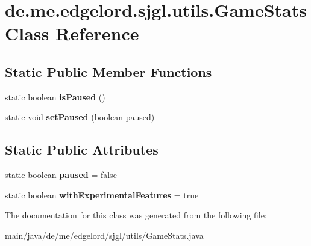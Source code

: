 \hypertarget{classde_1_1me_1_1edgelord_1_1sjgl_1_1utils_1_1_game_stats}{}\section{de.\+me.\+edgelord.\+sjgl.\+utils.\+Game\+Stats Class Reference}
\label{classde_1_1me_1_1edgelord_1_1sjgl_1_1utils_1_1_game_stats}
\subsection*{Static Public Member Functions}
\begin{DoxyCompactItemize}
\item 
\mbox{\label{classde_1_1me_1_1edgelord_1_1sjgl_1_1utils_1_1_game_stats_a15e6d13cdcbcdc3f1c305f3fc6cbec27}} 
static boolean {\bfseries is\+Paused} ()
\item 
\mbox{\label{classde_1_1me_1_1edgelord_1_1sjgl_1_1utils_1_1_game_stats_aee4eb85010066871fbb2e06cb2f98b60}} 
static void {\bfseries set\+Paused} (boolean paused)
\end{DoxyCompactItemize}
\subsection*{Static Public Attributes}
\begin{DoxyCompactItemize}
\item 
\mbox{\label{classde_1_1me_1_1edgelord_1_1sjgl_1_1utils_1_1_game_stats_a6de0c7e2b74640dcacb9eb43d7416a9d}} 
static boolean {\bfseries paused} = false
\item 
\mbox{\label{classde_1_1me_1_1edgelord_1_1sjgl_1_1utils_1_1_game_stats_a5d18e0f3f25d408b8304d32361e0417d}} 
static boolean {\bfseries with\+Experimental\+Features} = true
\end{DoxyCompactItemize}


The documentation for this class was generated from the following file\+:\begin{DoxyCompactItemize}
\item 
main/java/de/me/edgelord/sjgl/utils/Game\+Stats.\+java\end{DoxyCompactItemize}
